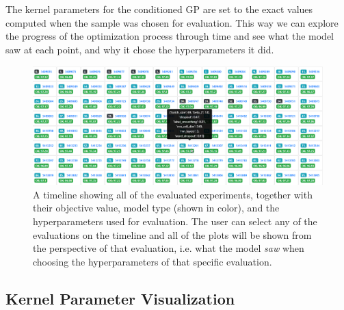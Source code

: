 The kernel parameters for the conditioned GP are set to the exact values computed when the sample was chosen for evaluation. This way we can explore the progress of the optimization process through time and see what the model saw at each point, and why it chose the hyperparameters it did.

\begin{figure}
	\begin{center}
		\includegraphics[width=1.0\textwidth]{images/timeline-view.png}
		\caption{A timeline showing all of the evaluated experiments, together with their objective value, model type (shown in color), and the hyperparameters used for evaluation. The user can select any of the evaluations on the timeline and all of the plots will be shown from the perspective of that evaluation, i.e. what the model \emph{saw} when choosing the hyperparameters of that specific evaluation.}
	\end{center}
\end{figure}
\label{figure:timeline-view}

\subsection{Kernel Parameter Visualization}
\label{section:kernel-parameter-visualization}

